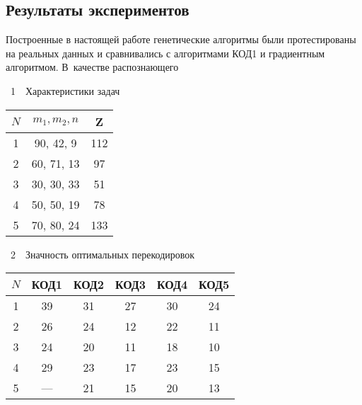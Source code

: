 \begin{multicols}{2}
\vspace*{-6pt}

\section{Результаты экспериментов}

\vspace*{-1pt}

Построенные в настоящей работе генетические алгоритмы были
протестированы на реальных данных и сравнивались с алгоритмами КОД1
и градиентным алгоритмом. В~качестве распознающего\linebreak\vspace*{-12pt}

\pagebreak

\begin{center}
{{\tablename~1}\ \ \small{Характеристики задач}}
\end{center}
{\small
      \begin{center}
      \tabcolsep=12pt
\begin{tabular}{|c|c|c|}
\hline
$N$ & $m_1, m_2, n$ & Z\\
\hline
1 & 90, 42, 9\hphantom{9} & 112\hphantom{9}\\
2 & 60, 71, 13 & 97\\
3 & 30, 30, 33 & 51\\
4 & 50, 50, 19 & 78\\
5 & 70, 80, 24 & 133\hphantom{9}\\
\hline
\end{tabular}
\end{center}}
\addtocounter{table}{1}


\vspace*{5pt}
\begin{center}
{{\tablename~2}\ \ \small{Значность оптимальных перекодировок}}
\end{center}
{\small
      \begin{center}
      \begin{tabular}{|c|c|c|c|c|c|}
\hline
$N$ & КОД1 & КОД2 & КОД3 & КОД4 & КОД5 \\
\hline
1 & 39 & 31 & 27 & 30 & 24 \\
2 & 26 & 24 & 12 & 22 & 11 \\
3 & 24 & 20 & 11 & 18 & 10 \\
4 & 29 & 23 & 17 & 23 & 15 \\
5 & ---  & 21 & 15 & 20 & 13 \\
\hline
\end{tabular}
\end{center}}
\addtocounter{table}{1}



\end{multicols}
